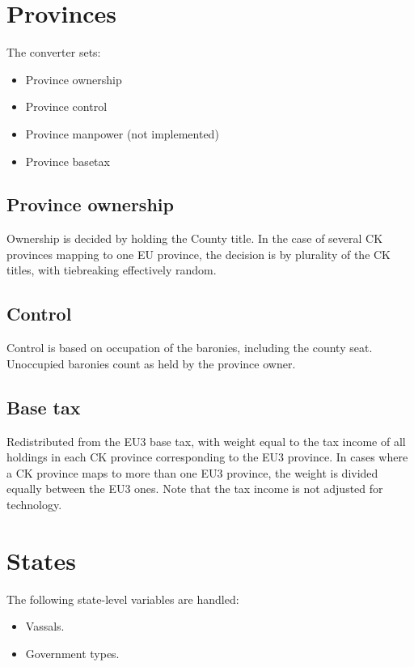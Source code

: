 \documentclass[12pt,ebook,oneside]{book}
\begin{document}
\chapter{Provinces}
The converter sets:
\begin{itemize}
\item Province ownership
\item Province control
\item Province manpower (not implemented)
\item Province basetax 
\end{itemize}

\section{Province ownership}

Ownership is decided by holding the County title. In the case
of several CK provinces mapping to one EU province, the decision
is by plurality of the CK titles, with tiebreaking effectively
random.

\section{Control}

Control is based on occupation of the baronies, including the
county seat. Unoccupied baronies count as held by the province 
owner. 

\section{Base tax}

Redistributed from the EU3 base tax, with weight equal to
the tax income of all holdings in each CK province corresponding
to the EU3 province. In cases where a CK province maps to more
than one EU3 province, the weight is divided equally between the
EU3 ones. Note that the tax income is not adjusted for technology. 

\chapter{States}

The following state-level variables are handled:
\begin{itemize}
\item Vassals.
\item Government types. 
\end{itemize}
\end{document}
